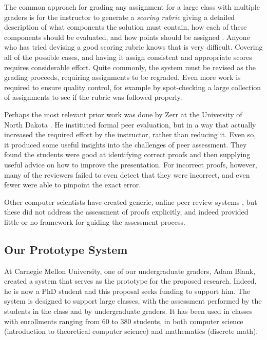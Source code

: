 \documentclass[12pt]{article}
\begin{document}
The common approach for grading any assignment for a large
class with multiple graders is for the instructor to generate a {\em
  scoring rubric} giving a detailed description of what components the
solution must contain, how each of these components should be
evaluated, and how points should be assigned
\citep{moskal-pa2000}.  Anyone who has tried devising a
good scoring rubric knows that is very difficult.  Covering all of the
possible cases, and having it assign consistent and appropriate scores
requires considerable effort.  Quite commonly, the system must be
revised as the grading proceeds, requiring assignments to be
regraded.  Even more work is required to ensure quality control, for
example by spot-checking a large collection of assignments to see if
the rubric was followed properly.

Perhaps the most relevant prior work was done by Zerr at the
University of North Dakota \citep{zerr-primus11}.
He instituted formal peer evaluation, but
in a way that actually increased the required effort by the
instructor, rather than reducing it.  Even so, it produced some
useful insights into the challenges of peer assessment.  They found
the students were good at identifying correct proofs and then
supplying useful advice on how to improve the presentation.  For
incorrect proofs, however, many of the reviewers failed to even detect
that they were incorrect, and even fewer were able to pinpoint the exact error.

Other computer scientists have created generic, online peer review systems
\citep{gehringer-sigcse05, wolfe-ite04}, but these did not address the
assessment of proofs explicitly, and indeed provided little or no
framework for guiding the assessment process.

\subsection{Our Prototype System}

At Carnegie Mellon University, one of our undergraduate graders, Adam
Blank, created a system that serves as the prototype for the proposed
research.  Indeed, he is now a PhD student and this proposal seeks
funding to support him.  The system is designed to support large classes,
with the assessment performed by the students in the class and by
undergraduate graders.  It has been used in classes with enrollments
ranging from 60 to 380 students, in both computer science (introduction
to theoretical computer science) and mathematics (discrete math).
\end{document}

